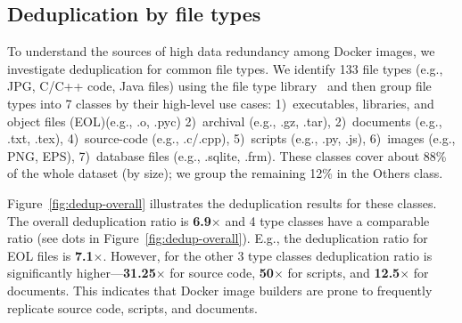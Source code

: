 \subsection{Deduplication by file types}



To understand the sources of high data redundancy among Docker images, we
investigate deduplication for common file types.
%
We identify 133 file types (e.g., JPG, C/C++ code, Java files)
using the file type library~\cite{pymagic} and then group file types into 7
classes by their high-level use cases:
%
1)~executables, libraries, and object files (EOL)(e.g., .o, .pyc)
%
%
2)~archival (e.g., .gz, .tar),
%
2)~documents (e.g., .txt, .tex),
%
4)~source-code (e.g., .c/.cpp),
%
5)~scripts (e.g., .py, .js),
%
6)~images (e.g., PNG, EPS),
%
7)~database files (e.g., .sqlite, .frm). 
%
%
These classes cover about 88\% of the whole dataset (by size);
we group the remaining 12\% in the Others class.
%

Figure~\ref{fig:dedup-overall} illustrates the deduplication results for these
classes.
%
The overall deduplication ratio is \textbf{6.9$\times$} and 4 type classes
have a comparable ratio (see dots in Figure~\ref{fig:dedup-overall}).
%
E.g., the deduplication ratio for EOL files is \textbf{7.1$\times$}.
%
However, for the other 3 type classes  
deduplication ratio is significantly
higher---\textbf{31.25$\times$} for source code,
\textbf{50$\times$} for scripts, and \textbf{12.5$\times$} for documents.
%
This indicates that Docker image builders are prone to frequently replicate
source code, scripts, and documents.
%

